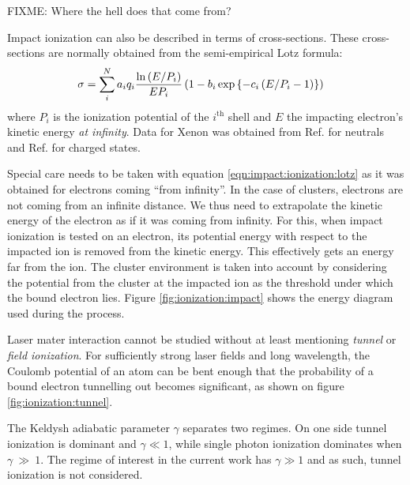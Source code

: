 FIXME: Where the hell does that come from?




Impact ionization can also be described in terms of cross-sections. These
cross-sections are normally obtained from the semi-empirical Lotz
formula\cite{Lotz1967}:
\begin{align}
\sigma & = \sum_{i}^{N} a_i q_i \frac{\ln{\left( E/P_i \right)}}{E P_i} \left( 1 - b_i
\exp{ \left\{ -c_i \left( E/P_i - 1 \right) \right\}} \right)
\label{eqn:impact:ionization:lotz}
\end{align}
where $P_i$ is the ionization potential of the $i^{\textrm{th}}$ shell and $E$
the impacting electron's kinetic energy \textit{at infinity}.
Data for Xenon was obtained from Ref. \cite{Tawara1987} for neutrals
and Ref. \cite{Heidenreich2005} for charged states.

Special care needs to be taken with equation \eqref{eqn:impact:ionization:lotz}
as it was obtained for electrons coming ``from infinity''. In the case of
clusters, electrons are not coming from an infinite distance. We thus need to
extrapolate the kinetic energy of the electron as if it was coming from
infinity. For this, when impact ionization is tested on an electron, its
potential energy with respect to the impacted ion is removed from the kinetic
energy. This effectively gets an energy far from the ion. The cluster
environment is taken into account by considering the potential from the cluster
at the impacted ion as the threshold under which the bound electron lies.
Figure \ref{fig:ionization:impact} shows the energy diagram used during the
process.



Laser mater interaction cannot be studied without at least mentioning
\textit{tunnel} or \textit{field ionization}. For sufficiently strong laser
fields and long wavelength, the Coulomb potential of an atom can be bent enough
that the probability of a bound electron tunnelling out becomes significant, as
shown on figure \ref{fig:ionization:tunnel}.


The Keldysh adiabatic parameter $\gamma$ separates two regimes\cite{Fennel2010}.
On one side tunnel ionization is dominant and $\gamma \ll 1$, while single
photon ionization dominates when $\gamma~\gg~1$. The regime of interest in the
current work has $\gamma \gg 1$ and as such, tunnel ionization is not
considered.


